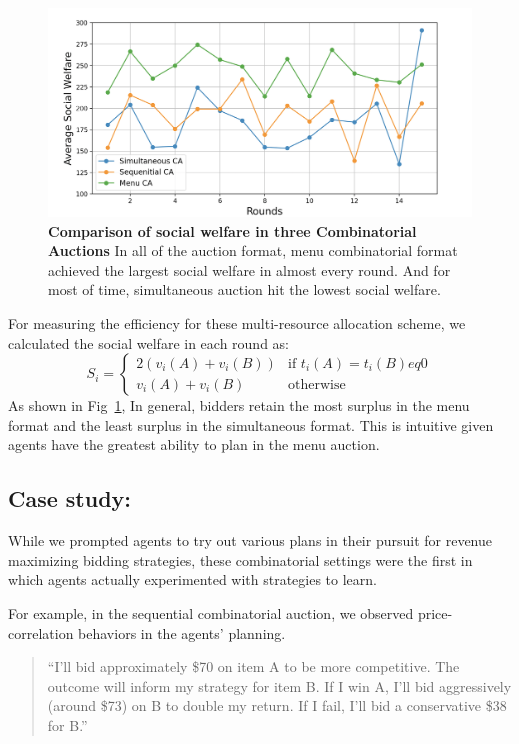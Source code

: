 \documentclass{article} %
\begin{document}
\begin{figure}[h]
    \centering \includegraphics[width=0.9\linewidth]{Figs/social_welfare.png}
    \caption{\textbf{Comparison of social welfare in three Combinatorial Auctions} In all of the auction format, menu combinatorial format achieved the largest social welfare in almost every round. 
    And for most of time, simultaneous auction hit the lowest social welfare.}
    \label{fig:social}
\end{figure}

For measuring the efficiency for these multi-resource allocation scheme, we calculated the social welfare in each round as:
\begin{equation}
   S_i = 
   \begin{cases}
      2 \left( v_i(A) + v_i(B) \right) & \text{if } t_i(A) = t_i(B) eq 0\\
      v_i(A) + v_i(B) & \text{otherwise}
   \end{cases}
\end{equation}
As shown in Fig~\ref{fig:social}, In general, bidders retain the most surplus in the menu format and the least surplus in the simultaneous format. 
This is intuitive given agents have the greatest ability to plan in the menu auction.


\subsection{Case study:}
While we prompted agents to try out various plans in their pursuit for revenue maximizing bidding strategies, these combinatorial settings were the first in which agents actually experimented with strategies to learn. 

For example, in the sequential combinatorial auction, we observed price-correlation behaviors in the agents' planning.
\begin{quote}
    ``I'll bid approximately \$70 on item A to be more competitive. The outcome will inform my strategy for item B. If I win A, I'll bid aggressively (around \$73) on B to double my return. If I fail, I'll bid a conservative \$38 for B.''
\end{quote}
\end{document}
